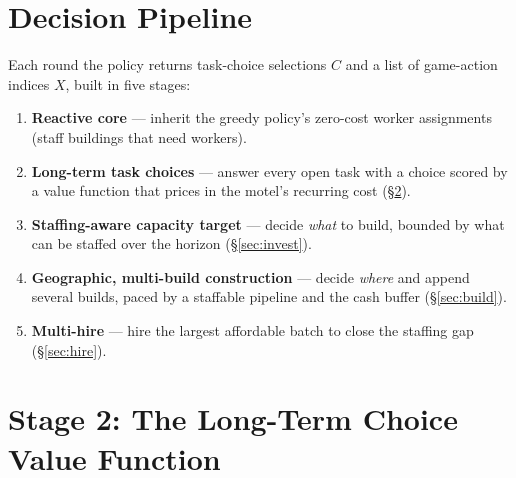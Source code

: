 \documentclass[11pt]{article}
\begin{document}
\section{Decision Pipeline}

Each round the policy returns task-choice selections $C$ and a list of game-action indices $X$,
built in five stages:
\begin{enumerate}[leftmargin=1.6em, itemsep=1pt]
\item \textbf{Reactive core} --- inherit the greedy policy's zero-cost worker assignments (staff
buildings that need workers).
\item \textbf{Long-term task choices} --- answer every open task with a choice scored by a value
function that prices in the motel's recurring cost (\S\ref{sec:choice}).
\item \textbf{Staffing-aware capacity target} --- decide \emph{what} to build, bounded by what can
be staffed over the horizon (\S\ref{sec:invest}).
\item \textbf{Geographic, multi-build construction} --- decide \emph{where} and append several
builds, paced by a staffable pipeline and the cash buffer (\S\ref{sec:build}).
\item \textbf{Multi-hire} --- hire the largest affordable batch to close the staffing gap
(\S\ref{sec:hire}).
\end{enumerate}

\section{Stage 2: The Long-Term Choice Value Function}
\label{sec:choice}
\end{document}
